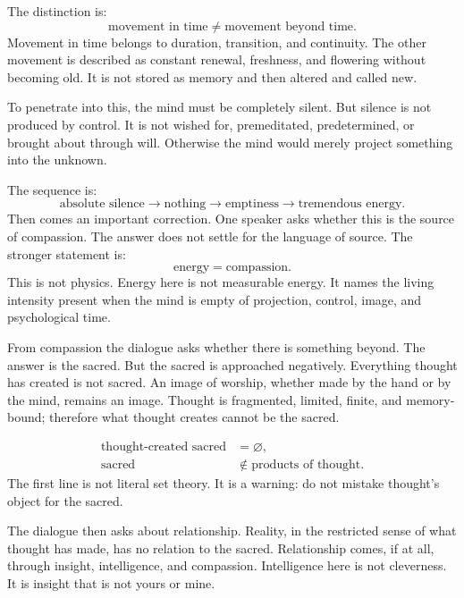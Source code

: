 The distinction is:
\begin{equation}
\text{movement in time}
\neq
\text{movement beyond time}.
\end{equation}
Movement in time belongs to duration, transition, and continuity. The other movement is described as constant renewal, freshness, and flowering without becoming old. It is not stored as memory and then altered and called new.

To penetrate into this, the mind must be completely silent. But silence is not produced by control. It is not wished for, premeditated, predetermined, or brought about through will. Otherwise the mind would merely project something into the unknown.

The sequence is:
\begin{equation}
\text{absolute silence}
\longrightarrow
\text{nothing}
\longrightarrow
\text{emptiness}
\longrightarrow
\text{tremendous energy}.
\end{equation}
Then comes an important correction. One speaker asks whether this is the source of compassion. The answer does not settle for the language of source. The stronger statement is:
\begin{equation}
\text{energy} = \text{compassion}.
\end{equation}
This is not physics. Energy here is not measurable energy. It names the living intensity present when the mind is empty of projection, control, image, and psychological time.

From compassion the dialogue asks whether there is something beyond. The answer is the sacred. But the sacred is approached negatively. Everything thought has created is not sacred. An image of worship, whether made by the hand or by the mind, remains an image. Thought is fragmented, limited, finite, and memory-bound; therefore what thought creates cannot be the sacred.

\begin{align}
\text{thought-created sacred} &= \varnothing, \\
\text{sacred} &\notin \text{products of thought}.
\end{align}
The first line is not literal set theory. It is a warning: do not mistake thought's object for the sacred.

The dialogue then asks about relationship. Reality, in the restricted sense of what thought has made, has no relation to the sacred. Relationship comes, if at all, through insight, intelligence, and compassion. Intelligence here is not cleverness. It is insight that is not yours or mine.

